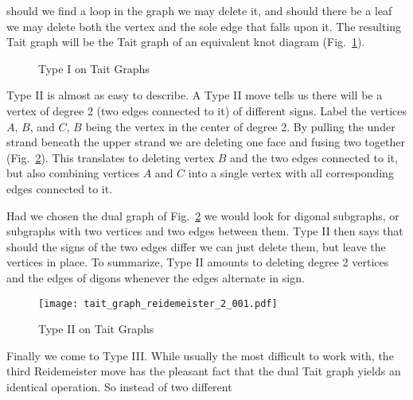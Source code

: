 \documentclass{article}
\theoremstyle{plain}
\begin{document}
        should we find a loop in the graph we may delete it, and should there
        be a leaf we may delete both the vertex and the sole edge that falls
        upon it. The resulting Tait graph will be the Tait graph of an
        equivalent knot diagram (Fig.~\ref{fig:tait_graph_reidemeister_1}).
        \begin{figure}
            \centering
            \caption{Type I on Tait Graphs}
            \label{fig:tait_graph_reidemeister_1}
        \end{figure}
        \par\hfill\par
        Type II is almost as easy to describe. A Type II move tells us there
        will be a vertex of degree 2 (two edges connected to it) of different
        signs. Label the vertices $A$, $B$, and $C$, $B$ being the vertex in
        the center of degree 2. By pulling the under strand beneath the upper
        strand we are deleting one face and fusing two together
        (Fig.~\ref{fig:tait_graph_reidemeister_2_001}). This translates to
        deleting vertex $B$ and the two edges connected to it, but also
        combining vertices $A$ and $C$ into a single vertex with all
        corresponding edges connected to it.
        \par\hfill\par
        Had we chosen the dual graph of
        Fig.~\ref{fig:tait_graph_reidemeister_2_001} we would look for digonal
        subgraphs, or subgraphs with two vertices and two edges between them.
        Type II then says that should the signs of the two edges differ we
        can just delete them, but leave the vertices in place. To summarize,
        Type II amounts to deleting degree 2 vertices and the edges of digons
        whenever the edges alternate in sign.
        \begin{figure}
            \centering
            \texttt{[image: tait\_graph\_reidemeister\_2\_001.pdf]}
            \caption{Type II on Tait Graphs}
            \label{fig:tait_graph_reidemeister_2_001}
        \end{figure}
        \par\hfill\par
        Finally we come to Type III. While usually the most difficult to work
        with, the third Reidemeister move has the pleasant fact that the dual
        Tait graph yields an identical operation. So instead of two different
\end{document}
